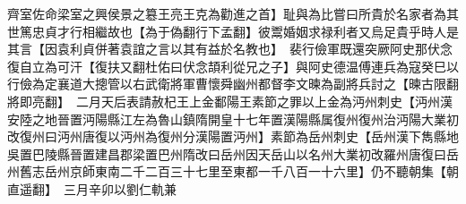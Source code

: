 齊室佐命梁室之興侯景之簒王亮王克為勸進之首】耻與為比嘗曰所貴於名家者為其世篤忠貞才行相繼故也【為于偽翻行下孟翻】彼鬻婚姻求禄利者又烏足貴乎時人是其言【因袁利貞併著袁誼之言以其有益於名教也】　裴行儉軍既還突厥阿史那伏念復自立為可汗【復扶又翻杜佑曰伏念頡利從兄之子】與阿史德温傅連兵為寇癸巳以行儉為定襄道大摠管以右武衛將軍曹懷舜幽州都督李文暕為副將兵討之【暕古限翻將即亮翻】　二月天后表請赦杞王上金鄱陽王素節之罪以上金為沔州刺史【沔州漢安陸之地晉置沔陽縣江左為魯山鎮隋開皇十七年置漢陽縣属復州復州治沔陽大業初改復州曰沔州唐復以沔州為復州分漢陽置沔州】素節為岳州刺史【岳州漢下雋縣地吳置巴陵縣晉置建昌郡梁置巴州隋改曰岳州因天岳山以名州大業初改羅州唐復曰岳州舊志岳州京師東南二千二百三十七里至東都一千八百一十六里】仍不聽朝集【朝直遥翻】　三月辛卯以劉仁軌兼